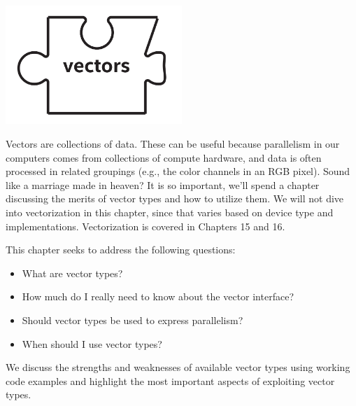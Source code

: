\begin{center}
	\includegraphics[width=0.5\textwidth]{content/chapter-11/images/1}
\end{center}

Vectors are collections of data. These can be useful because parallelism in our computers comes from collections of compute hardware, and data is often processed in related groupings (e.g., the color channels in an RGB pixel). Sound like a marriage made in heaven? It is so important, we’ll spend a chapter discussing the merits of vector types and how to utilize them. We will not dive into vectorization in this chapter, since that varies based on device type and implementations. Vectorization is covered in Chapters 15 and 16.\par

This chapter seeks to address the following questions:\par

\begin{itemize}
	\item What are vector types?
	\item How much do I really need to know about the vector 	interface?
	\item Should vector types be used to express parallelism? 
	\item When should I use vector types?
\end{itemize}

We discuss the strengths and weaknesses of available vector types using working code examples and highlight the most important aspects of exploiting vector types.\par




























